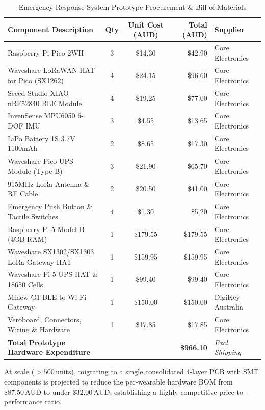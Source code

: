 \begin{table}[htbp]
    \centering
    \caption{Emergency Response System Prototype Procurement \& Bill of Materials}
    \label{tab:procurement_bom}
    \begin{tabularx}{\textwidth}{l c c r l}
        \toprule
        \textbf{Component Description} & \textbf{Qty} & \textbf{Unit Cost (AUD)} & \textbf{Total (AUD)} & \textbf{Supplier} \\
        \midrule
        Raspberry Pi Pico 2WH & 3 & \$14.30 & \$42.90 & Core Electronics \\
        Waveshare LoRaWAN HAT for Pico (SX1262) & 4 & \$24.15 & \$96.60 & Core Electronics \\
        Seeed Studio XIAO nRF52840 BLE Module & 4 & \$19.25 & \$77.00 & Core Electronics \\
        InvenSense MPU6050 6-DOF IMU & 3 & \$4.55 & \$13.65 & Core Electronics \\
        LiPo Battery 1S 3.7V 1100mAh & 2 & \$8.65 & \$17.30 & Core Electronics \\
        Waveshare Pico UPS Module (Type B) & 3 & \$21.90 & \$65.70 & Core Electronics \\
        915MHz LoRa Antenna \& RF Cable & 2 & \$20.50 & \$41.00 & Core Electronics \\
        Emergency Push Button \& Tactile Switches & 4 & \$1.30 & \$5.20 & Core Electronics \\
        Raspberry Pi 5 Model B (4GB RAM) & 1 & \$179.55 & \$179.55 & Core Electronics \\
        Waveshare SX1302/SX1303 LoRa Gateway HAT & 1 & \$159.95 & \$159.95 & Core Electronics \\
        Waveshare Pi 5 UPS HAT \& 18650 Cells & 1 & \$99.40 & \$99.40 & Core Electronics \\
        Minew G1 BLE-to-Wi-Fi Gateway & 1 & \$150.00 & \$150.00 & DigiKey Australia \\
        Veroboard, Connectors, Wiring \& Hardware & 1 & \$17.85 & \$17.85 & Core Electronics \\
        \midrule
        \textbf{Total Prototype Hardware Expenditure} & & & \textbf{\$966.10} & \textit{Excl. Shipping} \\
        \bottomrule
    \end{tabularx}
\end{table}

At scale ($>500\,\text{units}$), migrating to a single consolidated 4-layer PCB with SMT components is projected to reduce the per-wearable hardware BOM from $\$87.50\,\text{AUD}$ to under $\$32.00\,\text{AUD}$, establishing a highly competitive price-to-performance ratio.

